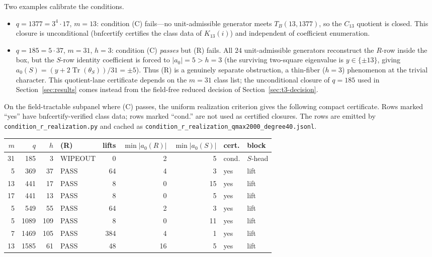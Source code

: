 \documentclass[11pt]{article}
\theoremstyle{plain}
\theoremstyle{definition}
\theoremstyle{remark}
\newcommand{\Tr}{\operatorname{Tr}}
\begin{document}
Two examples calibrate the conditions.
\begin{itemize}
\item $q=1377=3^4\cdot17$, $m=13$: condition (C) fails---no unit-admissible
  generator meets $T_B(13,1377)$, so the $C_{13}$ quotient is closed. This
  closure is unconditional ($\mathrm{bnfcertify}$ certifies the class data of
  $K_{13}(i)$) and independent of coefficient enumeration.
\item $q=185=5\cdot37$, $m=31$, $h=3$: condition (C) \emph{passes} but (R)
  fails. All $24$ unit-admissible generators reconstruct the $R$-row inside the
  box, but the $S$-row identity coefficient is forced to $|a_0|=5>h=3$ (the
  surviving two-square eigenvalue is $y\in\{\pm13\}$, giving
  $a_0(S)=(y+2\Tr(\theta_S))/31=\pm5$). Thus (R) is a genuinely separate
  obstruction, a thin-fiber ($h=3$) phenomenon at the trivial character. This
  quotient-lane certificate depends on the $m=31$ class list; the unconditional
  closure of $q=185$ used in Section~\ref{sec:results} comes instead from the
  field-free reduced decision of Section~\ref{sec:t3-decision}.
\end{itemize}

On the field-tractable subpanel where (C) passes, the uniform realization
criterion gives the following compact certificate. Rows marked ``yes'' have
$\mathrm{bnfcertify}$-verified class data; rows marked ``cond.'' are not used as
certified closures. The rows are emitted by
\texttt{condition\_r\_realization.py} and cached as
\texttt{condition\_r\_realization\_qmax2000\_degree40.jsonl}.

\begin{center}
\small
\begin{tabular}{r r r l r r r l l}
$m$ & $q$ & $h$ & (R) & lifts & $\min|a_0(R)|$ & $\min|a_0(S)|$ & cert. & block\\
\hline
31 & 185  & 3   & WIPEOUT & 0   & 2  & 5  & cond. & $S$-head\\
5  & 369  & 37  & PASS    & 64  & 4  & 3  & yes   & lift\\
13 & 441  & 17  & PASS    & 8   & 0  & 15 & yes   & lift\\
17 & 441  & 13  & PASS    & 8   & 0  & 5  & yes   & lift\\
5  & 549  & 55  & PASS    & 64  & 2  & 3  & yes   & lift\\
5  & 1089 & 109 & PASS    & 8   & 0  & 11 & yes   & lift\\
7  & 1469 & 105 & PASS    & 384 & 4  & 1  & yes   & lift\\
13 & 1585 & 61  & PASS    & 48  & 16 & 5  & yes   & lift\\
\end{tabular}
\end{center}
\end{document}
